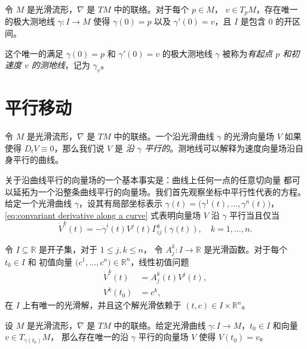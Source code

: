 \documentclass[fontset=none]{Notes}
\begin{document}
\begin{corollary}
  令 $M$ 是光滑流形，$\nabla$ 是 $TM$ 中的联络。对于每个 $p\in M$，
  $v\in T_pM$，存在唯一的极大测地线 $\gamma:I\to M$ 使得
  $\gamma(0)=p$ 以及 $\gamma'(0)=v$，且 $I$ 是包含 $0$
  的开区间。
\end{corollary}

这个唯一的满足 $\gamma(0)=p$ 和 $\gamma'(0)=v$ 的极大测地线 $\gamma$
被称为\emph{有起点 $p$ 和初速度 $v$ 的测地线}，记为 $\gamma_v$。

\section{平行移动}

令 $M$ 是光滑流形，$\nabla$ 是 $TM$ 中的联络。一个沿光滑曲线 $\gamma$
的光滑向量场 $V$ 如果使得 $D_tV\equiv 0$，那么我们说 $V$ 是
\emph{沿 $\gamma$ 平行的}。测地线可以解释为速度向量场沿自身平行的曲线。

关于沿曲线平行的向量场的一个基本事实是：曲线上任何一点的任意切向量
都可以延拓为一个沿整条曲线平行的向量场。我们首先观察坐标中平行性代表的方程。
给定一个光滑曲线 $\gamma$，设其有局部坐标表示 
$\gamma(t)=\bigl(\gamma^1(t),\dots,\gamma^n(t)\bigr)$，
\eqref{eq:convariant derivative along a curve} 式表明向量场 $V$ 
沿 $\gamma$ 平行当且仅当
\begin{equation}
  \dot V^k(t)=-\dot\gamma^i(t)V^j(t)\Gamma_{ij}^k(\gamma(t)),
  \quad k=1,\dots,n.
\end{equation}

\begin{theorem}
  令 $I\subseteq \mathbb{R}$ 是开子集，对于 $1\leq j,k\leq n$，
  令 $A_j^k:I\to \mathbb{R}$ 是光滑函数。对于每个 $t_0\in I$ 和
  初值向量 $\bigl(c^1,\dots,c^n\bigr)\in \mathbb{R}^n$，线性初值问题
  \begin{equation}
    \begin{aligned}
      \dot V^k(t)&=A_j^k(t)V^j(t),\\
      V^k(t_0)&=c^k,
    \end{aligned}
  \end{equation}
  在 $I$ 上有唯一的光滑解，并且这个解光滑依赖于 $(t,c)\in I\times \mathbb{R}^n$。
\end{theorem}

\begin{theorem}[平行移动的存在性]\label{thm:existence of parallel transport}
  设 $M$ 是光滑流形，$\nabla$ 是 $TM$ 中的联络。给定光滑曲线
  $\gamma:I\to M$，$t_0\in I$ 和向量 $v\in T_{\gamma(t_0)}M$，
  那么存在唯一的沿 $\gamma$ 平行的向量场 $V$ 使得 $V(t_0)=v$。
\end{theorem}
\end{document}

